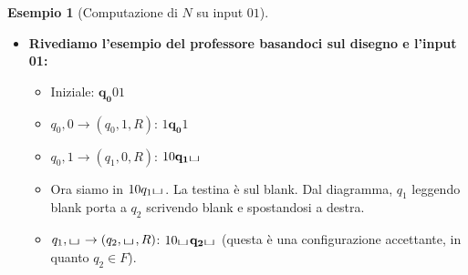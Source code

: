 \documentclass[a4paper]{article}
\theoremstyle{definition} %
\newtheorem{example}{Esempio}
\newcommand{\blankS}{\ensuremath{\raisebox{-0.15ex}{\scalebox{1.3}[0.7]{$\sqcup$}}\mkern2mu}}
\begin{document}
\begin{example}[Computazione di $N$ su input $01$]
\begin{enumerate}
    \begin{itemize}
        \item \textbf{Rivediamo l'esempio del professore basandoci sul disegno e l'input 01:}
        \begin{itemize}
            \item Iniziale: $\mathbf{q_0}01$
            \item $q_0,0 \to (q_0,1,R)$: $1\mathbf{q_0}1$
            \item $q_0,1 \to (q_1,0,R)$: $10\mathbf{q_1}\blankS$
            \item Ora siamo in $10q_1\blankS$. La testina è sul blank. Dal diagramma, $q_1$ leggendo blank porta a $q_2$ scrivendo blank e spostandosi a destra.
            \item $q_1,\blankS \to (q_2,\blankS,R)$: $10\blankS\mathbf{q_2}\blankS$ (questa è una configurazione accettante, in quanto $q_2 \in F$).
        \end{itemize}
        

\end{itemize}
\end{enumerate}
\end{example}
\end{document}
